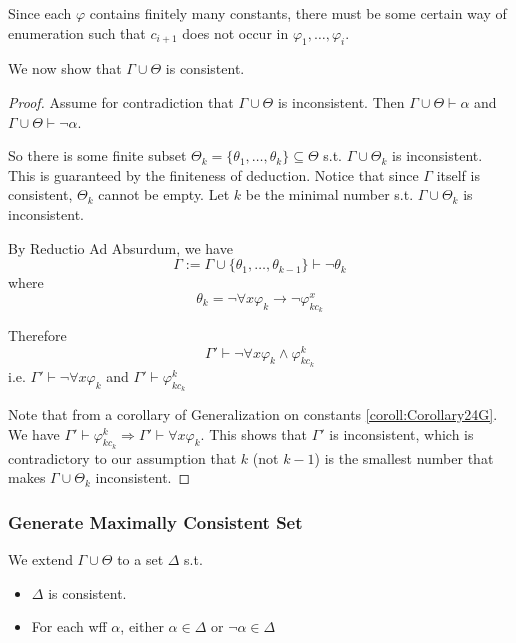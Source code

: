Since each $\varphi$ contains finitely many constants, there must be some certain way of enumeration such that $c_{i+1}$ does not occur in $\varphi_1,\dots,\varphi_i$.

We now show that $\Gamma\cup\Theta$ is consistent.

\begin{proof}
    Assume for contradiction that $\Gamma\cup\Theta$ is inconsistent. Then $\Gamma\cup\Theta\vdash\alpha$ and $\Gamma\cup\Theta\vdash\neg\alpha$.

    So there is some finite subset $\Theta_k = \{\theta_1,\dots,\theta_k\} \subseteq \Theta$ s.t. $\Gamma\cup\Theta_k$ is inconsistent. This is guaranteed by the finiteness of deduction. Notice that since $\Gamma$ itself is consistent, $\Theta_k$ cannot be empty. Let $k$ be the minimal number s.t. $\Gamma\cup\Theta_k$ is inconsistent.

    By Reductio Ad Absurdum, we have
    \[ \Gamma:=\Gamma\cup\{ \theta_1,\dots,\theta_{k-1} \} \vdash \neg \theta_k \]
    where
    \[ \theta_k = \neg\forall x \varphi_k \to \neg \varphi_{kc_k}^x \]

    Therefore
    \[ \Gamma' \vdash \neg\forall{x}\varphi_k \wedge \varphi_{kc_k}^k \]
    i.e. $\Gamma' \vdash \neg\forall{x}\varphi_k$ and $\Gamma'\vdash\varphi_{kc_k}^k$

    Note that from a corollary of Generalization on constants \ref{coroll:Corollary24G}. We have $\Gamma'\vdash\varphi_{kc_k}^k\Longrightarrow \Gamma'\vdash\forall{x}\varphi_k$. This shows that $\Gamma'$ is inconsistent, which is contradictory to our assumption that $k$ (not $k-1$) is the smallest number that makes $\Gamma\cup\Theta_k$ inconsistent.
\end{proof}

\subsubsection{Generate Maximally Consistent Set}

We extend $\Gamma\cup\Theta$ to a set $\Delta$ s.t.

\begin{itemize}
    \item $\Delta$ is consistent.
    \item For each wff $\alpha$, either $\alpha\in\Delta$ or $\neg\alpha\in\Delta$
\end{itemize}

